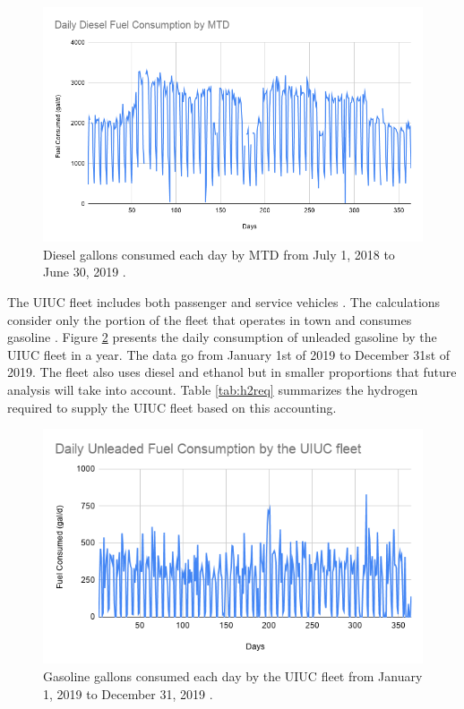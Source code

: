 \documentclass{anstrans}
\begin{document}
\begin{figure}[H]
	\centering
	\includegraphics[width=1.05\linewidth]{figures/mtd-fuel-consumption.png}
	\hfill
	\caption{Diesel gallons consumed each day by \gls{MTD} from July 1, 2018 to June 30, 2019 \cite{mtd_irecords_2019}.}
	\label{fig:mtdfuel}
\end{figure}

The \gls{UIUC} fleet includes both passenger and service vehicles \cite{uiuc_institute_for_sustainability_energy_and_environment_increase_2020}. The calculations consider only the portion of the fleet that operates in town and consumes gasoline \cite{uiuc_personnal_communication}. Figure \ref{fig:uiucfuel} presents the daily consumption of unleaded gasoline by the \gls{UIUC} fleet in a year. The data go from January 1st of 2019 to December 31st of 2019. The fleet also uses diesel and ethanol but in smaller proportions that future analysis will take into account.
Table \ref{tab:h2req} summarizes the hydrogen required to supply the \gls{UIUC} fleet based on this accounting.

\begin{figure}[H]
	\centering
	\includegraphics[width=0.95\linewidth]{figures/uiuc-unleaded.png}
	\hfill
	\caption{Gasoline gallons consumed each day by the \gls{UIUC} fleet from January 1, 2019 to December 31, 2019 \cite{uiuc_personnal_communication}.}
	\label{fig:uiucfuel}
\end{figure}
\end{document}
